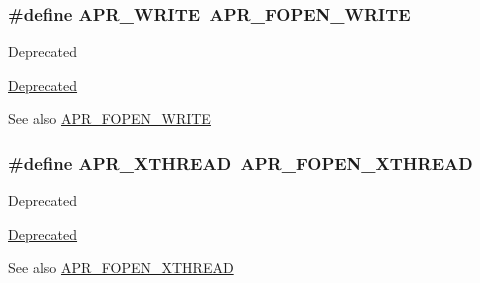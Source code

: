 \subsubsection[{\texorpdfstring{A\+P\+R\+\_\+\+W\+R\+I\+TE}{APR_WRITE}}]{\setlength{\rightskip}{0pt plus 5cm}\#define A\+P\+R\+\_\+\+W\+R\+I\+TE~{\bf A\+P\+R\+\_\+\+F\+O\+P\+E\+N\+\_\+\+W\+R\+I\+TE}}\hypertarget{group__apr__file__open__flags_ga3e427e53aceb1ccdb078d9a03cd63d01}{}\label{group__apr__file__open__flags_ga3e427e53aceb1ccdb078d9a03cd63d01}
\begin{DoxyRefDesc}{Deprecated}
\item[\hyperlink{deprecated__deprecated000018}{Deprecated}]\end{DoxyRefDesc}
\begin{DoxySeeAlso}{See also}
\hyperlink{group__apr__file__open__flags_gac598bb95fc9476b0bf2ed0b1c308842c}{A\+P\+R\+\_\+\+F\+O\+P\+E\+N\+\_\+\+W\+R\+I\+TE} 
\end{DoxySeeAlso}
\subsubsection[{\texorpdfstring{A\+P\+R\+\_\+\+X\+T\+H\+R\+E\+AD}{APR_XTHREAD}}]{\setlength{\rightskip}{0pt plus 5cm}\#define A\+P\+R\+\_\+\+X\+T\+H\+R\+E\+AD~{\bf A\+P\+R\+\_\+\+F\+O\+P\+E\+N\+\_\+\+X\+T\+H\+R\+E\+AD}}\hypertarget{group__apr__file__open__flags_gaa9120c0e395d8a0e640b5eafa8f11cce}{}\label{group__apr__file__open__flags_gaa9120c0e395d8a0e640b5eafa8f11cce}
\begin{DoxyRefDesc}{Deprecated}
\item[\hyperlink{deprecated__deprecated000026}{Deprecated}]\end{DoxyRefDesc}
\begin{DoxySeeAlso}{See also}
\hyperlink{group__apr__file__open__flags_ga435cd9b2604b11796779c23ffa00a3dd}{A\+P\+R\+\_\+\+F\+O\+P\+E\+N\+\_\+\+X\+T\+H\+R\+E\+AD} 
\end{DoxySeeAlso}
